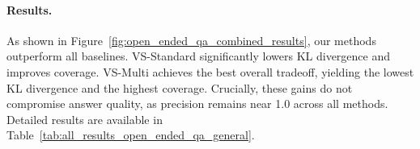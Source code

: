 \paragraph{Results.} 
As shown in Figure~\ref{fig:open_ended_qa_combined_results}, our methods outperform all baselines. VS-Standard significantly lowers KL divergence and improves coverage. VS-Multi achieves the best overall tradeoff, yielding the lowest KL divergence and the highest coverage. Crucially, these gains do not compromise answer quality, as precision remains near 1.0 across all methods. Detailed results are available in Table~\ref{tab:all_results_open_ended_qa_general}.








